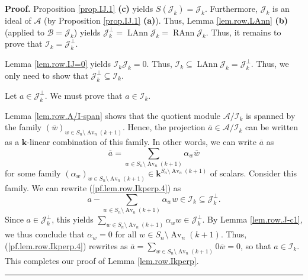 \documentclass[numbers=enddot,12pt,final,onecolumn,notitlepage]{scrartcl}%
\numberwithin{exer}{subsection}
\theoremstyle{definition}
\newenvironment{proof}[1][Proof]{\noindent\textbf{#1.} }{\ \rule{0.5em}{0.5em}}
\let\sumnonlimits\sum
\renewcommand{\sum}{\sumnonlimits\limits}
\begin{document}
\begin{proof}
Proposition \ref{prop.IJ.1} \textbf{(c)} yields $S\left(  \mathcal{J}%
_{k}\right)  =\mathcal{J}_{k}$. Furthermore, $\mathcal{J}_{k}$ is an ideal of
$\mathcal{A}$ (by Proposition \ref{prop.IJ.1} \textbf{(a)}). Thus, Lemma
\ref{lem.row.LAnn} \textbf{(b)} (applied to $\mathcal{B}=\mathcal{J}_{k}$)
yields $\mathcal{J}_{k}^{\perp}=\operatorname*{LAnn}\mathcal{J}_{k}%
=\operatorname*{RAnn}\mathcal{J}_{k}$. Thus, it remains to prove that
$\mathcal{I}_{k}=\mathcal{J}_{k}^{\perp}$.

Lemma \ref{lem.row.IJ=0} yields $\mathcal{I}_{k}\mathcal{J}_{k}=0$. Thus,
$\mathcal{I}_{k}\subseteq\operatorname*{LAnn}\mathcal{J}_{k}=\mathcal{J}%
_{k}^{\perp}$. Thus, we only need to show that $\mathcal{J}_{k}^{\perp
}\subseteq\mathcal{I}_{k}$.

Let $a\in\mathcal{J}_{k}^{\perp}$. We must prove that $a\in\mathcal{I}_{k}$.

Lemma \ref{lem.row.A/I-span} shows that the quotient module $\mathcal{A}%
/\mathcal{I}_{k}$ is spanned by the family $\left(  \overline{w}\right)
_{w\in S_{n}\setminus\operatorname*{Av}\nolimits_{n}\left(  k+1\right)  }$.
Hence, the projection $\overline{a}\in\mathcal{A}/\mathcal{I}_{k}$ can be
written as a $\mathbf{k}$-linear combination of this family. In other words,
we can write $\overline{a}$ as%
\begin{equation}
\overline{a}=\sum_{w\in S_{n}\setminus\operatorname*{Av}\nolimits_{n}\left(
k+1\right)  }\alpha_{w}\overline{w} \label{pf.lem.row.Ikperp.4}%
\end{equation}
for some family $\left(  \alpha_{w}\right)  _{w\in S_{n}\setminus
\operatorname*{Av}\nolimits_{n}\left(  k+1\right)  }\in\mathbf{k}%
^{S_{n}\setminus\operatorname*{Av}\nolimits_{n}\left(  k+1\right)  }$ of
scalars. Consider this family. We can rewrite (\ref{pf.lem.row.Ikperp.4}) as%
\[
a-\sum_{w\in S_{n}\setminus\operatorname*{Av}\nolimits_{n}\left(  k+1\right)
}\alpha_{w}w\in\mathcal{I}_{k}\subseteq\mathcal{J}_{k}^{\perp}.
\]
Since $a\in\mathcal{J}_{k}^{\perp}$, this yields $\sum_{w\in S_{n}%
\setminus\operatorname*{Av}\nolimits_{n}\left(  k+1\right)  }\alpha_{w}%
w\in\mathcal{J}_{k}^{\perp}$. By Lemma \ref{lem.row.J-c1}, we thus conclude
that $\alpha_{w}=0$ for all $w\in S_{n}\setminus\operatorname*{Av}%
\nolimits_{n}\left(  k+1\right)  $. Thus, (\ref{pf.lem.row.Ikperp.4}) rewrites
as $\overline{a}=\sum_{w\in S_{n}\setminus\operatorname*{Av}\nolimits_{n}%
\left(  k+1\right)  }0\overline{w}=0$, so that $a\in\mathcal{I}_{k}$. This
completes our proof of Lemma \ref{lem.row.Ikperp}.
\end{proof}
\end{document}
